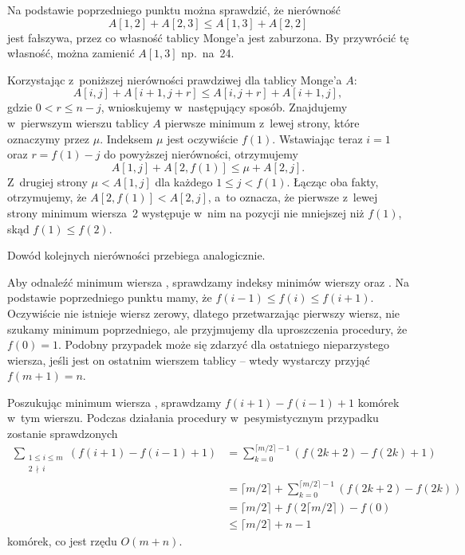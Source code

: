 \subproblem %
Na podstawie poprzedniego punktu można sprawdzić, że nierówność
\[
	A[1,2]+A[2,3] \le A[1,3]+A[2,2]
\]
jest fałszywa, przez co własność tablicy Monge'a jest zaburzona. By przywrócić tę własność, można zamienić $A[1,3]$ np.\ na~24.

\subproblem %
Korzystając z~poniższej nierówności prawdziwej dla tablicy Monge'a $A$:
\[
	A[i,j]+A[i+1,j+r] \le A[i,j+r]+A[i+1,j],
\]
gdzie $0<r\le n-j$, wnioskujemy w~następujący sposób. Znajdujemy w~pierwszym wierszu tablicy $A$ pierwsze minimum z~lewej strony, które oznaczymy przez $\mu$. Indeksem $\mu$ jest oczywiście $f(1)$. Wstawiając teraz $i=1$ oraz $r=f(1)-j$ do powyższej nierówności, otrzymujemy
\[
	A[1,j]+A[2,f(1)] \le \mu+A[2,j].
\]
Z~drugiej strony $\mu<A[1,j]$ dla każdego $1\le j<f(1)$. Łącząc oba fakty, otrzymujemy, że $A[2,f(1)]<A[2,j]$, a~to oznacza, że pierwsze z~lewej strony minimum wiersza~2 występuje w~nim na pozycji nie mniejszej niż $f(1)$, skąd $f(1)\le f(2)$.

Dowód kolejnych nierówności przebiega analogicznie.

\subproblem %
Aby odnaleźć minimum wiersza , sprawdzamy indeksy minimów wierszy  oraz . Na podstawie poprzedniego punktu mamy, że $f(i-1)\le f(i)\le f(i+1)$. Oczywiście nie istnieje wiersz zerowy, dlatego przetwarzając pierwszy wiersz, nie szukamy minimum poprzedniego, ale przyjmujemy dla uproszczenia procedury, że $f(0)=1$. Podobny przypadek może się zdarzyć dla ostatniego nieparzystego wiersza, jeśli jest on ostatnim wierszem tablicy -- wtedy wystarczy przyjąć $f(m+1)=n$.

Poszukując minimum wiersza , sprawdzamy $f(i+1)-f(i-1)+1$ komórek w~tym wierszu. Podczas działania procedury w~pesymistycznym przypadku zostanie sprawdzonych
\begin{align*}
	\sum_{\substack{1\le i\le m\\2\,\nmid\,i}}(f(i+1)-f(i-1)+1) &= \sum_{k=0}^{\lceil m/2\rceil-1}(f(2k+2)-f(2k)+1) \\[-4mm]
	&= \lceil m/2\rceil+\sum_{k=0}^{\lceil m/2\rceil-1}(f(2k+2)-f(2k)) \\[1mm]
	&= \lceil m/2\rceil+f(2\lceil m/2\rceil)-f(0) \\[2mm]
	&\le \lceil m/2\rceil+n-1
\end{align*}
komórek, co jest rzędu $O(m+n)$.

